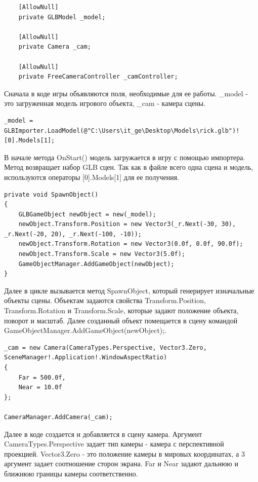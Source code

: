 \begin{lstlisting}
	[AllowNull]
	private GLBModel _model;
	
	[AllowNull]
	private Camera _cam;
	
	[AllowNull]
	private FreeCameraController _camController;
\end{lstlisting}

Сначала в коде игры объявляются поля, необходимые для ее работы.  \_model - это загруженная модель игрового объекта, \_cam - камера сцены.

\begin{lstlisting}
_model = GLBImporter.LoadModel(@"C:\Users\it_ge\Desktop\Models\rick.glb")![0].Models[1];
\end{lstlisting}

В начале метода OnStart() модель загружается в игру с помощью импортера. Метод возвращает набор GLB сцен. Так как в файле всего одна сцена и модель, используются операторы [0].Models[1] для ее получения.

\begin{lstlisting}
private void SpawnObject()
{
	GLBGameObject newObject = new(_model);
	newObject.Transform.Position = new Vector3(_r.Next(-30, 30), _r.Next(-20, 20), _r.Next(-100, -10));
	newObject.Transform.Rotation = new Vector3(0.0f, 0.0f, 90.0f);
	newObject.Transform.Scale = new Vector3(5.0f);
	GameObjectManager.AddGameObject(newObject);
}
\end{lstlisting}

Далее в цикле вызывается метод SpawnObject, который генерирует изначальные объекты сцены. Объектам задаются свойства Transform.Position, Transform.Rotation и Transform.Scale, которые задают положение объекта, поворот и масштаб. Далее созданный объект помещается в сцену командой GameObjectManager.AddGameObject(newObject);.

\begin{lstlisting}
_cam = new Camera(CameraTypes.Perspective, Vector3.Zero, SceneManager!.Application!.WindowAspectRatio) 
{
	Far = 500.0f,
	Near = 10.0f
};

CameraManager.AddCamera(_cam);
\end{lstlisting}

Далее в коде создается и добавляется в сцену камера. Аргумент CameraTypes.Perspective задает тип камеры - камера с перспективной проекцией. Vector3.Zero - это положение камеры в мировых координатах, а 3 аргумент задает соотношение сторон экрана. Far и Near задают дальнюю и ближнюю границы камеры соответственно.

